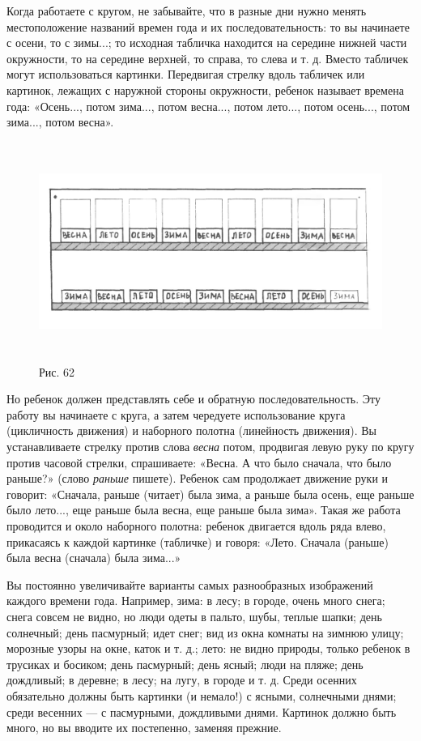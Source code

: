 \documentclass[a5paper]{book}
\renewcommand{\emph}[1]{\textit{#1}}
\begin{document}
Когда работаете с кругом, не забывайте, что в разные дни нужно менять
местоположение названий времен года и их последовательность: то вы
начинаете с осени, то с зимы...; то исходная табличка находится на
середине нижней части окружности, то на середине верхней, то справа, то
слева и т. д. Вместо табличек могут использоваться картинки. Передвигая
стрелку вдоль табличек или картинок, лежащих с наружной стороны
окружности, ребенок называет времена года: «Осень..., потом зима...,
потом весна..., потом лето..., потом осень..., потом зима..., потом
весна».

\begin{figure}
\centering
\includegraphics[width=6.21421in,height=2.81563in]{media/media/image59.jpg}
\caption*{Рис. 62}
\end{figure}

Но ребенок должен представлять себе и обратную последовательность. Эту
работу вы начинаете с круга, а затем чередуете использование круга
(цикличность движения) и наборного полотна (линейность движения). Вы
устанавливаете стрелку против слова \emph{весна} потом, продвигая левую
руку по кругу против часовой стрелки, спрашиваете: «Весна. А что было
сначала, что было раньше?» (слово \emph{раньше} пишете). Ребенок сам
продолжает движение руки и говорит: «Сначала, раньше (читает) была зима,
а раньше была осень, еще раньше было лето..., еще раньше была весна, еще
раньше была зима». Такая же работа проводится и около наборного полотна:
ребенок двигается вдоль ряда влево, прикасаясь к каждой картинке
(табличке) и говоря: «Лето. Сначала (раньше) была весна (сначала) была
зима...»

Вы постоянно увеличивайте варианты самых разнообразных изображений
каждого времени года. Например, зима: в лесу; в городе, очень много
снега; снега совсем не видно, но люди одеты в пальто, шубы, теплые
шапки; день солнечный; день пасмурный; идет снег; вид из окна комнаты на
зимнюю улицу; морозные узоры на окне, каток и т. д.; лето: не видно
природы, только ребенок в трусиках и босиком; день пасмурный; день
ясный; люди на пляже; день дождливый; в деревне; в лесу; на лугу, в
городе и т. д. Среди осенних обязательно должны быть картинки (и
немало!) с ясными, солнечными днями; среди весенних --- с пасмурными,
дождливыми днями. Картинок должно быть много, но вы вводите их
постепенно, заменяя прежние.
\end{document}
